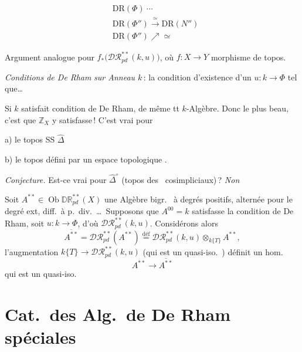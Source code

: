 \documentclass[11pt,a4paper]{article}
\begin{document}
\[
  \begin{aligned}
    &\mathrm{DR}(\Phi)\ \cdots\\
    &\mathrm{DR}(\Phi'')\xrightarrow{\ \simeq\ }\mathrm{DR}(N'')\\
    &\mathrm{DR}(\Phi'')\nearrow\simeq
  \end{aligned}
\]

Argument analogue pour $f_{*}\bigl(\mathcal{DR}^{**}_{pd}(k,u)\bigr)$, où
$f\colon X\to Y$ morphisme de topos.

\emph{Conditions de De Rham} \emph{sur Anneau $k$}\,: la condition
d'existence d'un $u\colon k\to\Phi$ tel que…

Si $k$ satisfait condition de De Rham, de même tt $k$-Algèbre. Donc le plus
beau, c'est que $\mathbb{Z}_{X}$ y satisfasse\,! C'est vrai pour

\quad a) le topos SS $\widehat{\Delta}$

\quad b) le topos défini par un espace topologique .

\emph{Conjecture.} Est-ce vrai pour $\widehat{\Delta}^{\circ}$ (topos des
\ cosimpliciaux)\,? \emph{Non}

Soit $A^{**}\in\operatorname{Ob}\mathbb{DR}^{**}_{pd}(X)$ une Algèbre bigr.\
 à degrés positifs, alternée pour le degré ext, diff.\ à p.\
div.\ …\ Supposons que $A^{00}=k$ satisfasse la condition de De Rham, soit
$u\colon k\to\Phi$, d'où $\mathcal{DR}^{**}_{pd}(k,u)$. Considérons alors
\[
  \overline{A^{**}}=\mathcal{DR}^{**}_{pd}(A^{**})
  \overset{\mathrm{déf}}{=}\mathcal{DR}^{**}_{pd}(k,u)\otimes_{k\{T\}}A^{**},
\]
l'augmentation $k\{T\}\to\mathcal{DR}^{**}_{pd}(k,u)$ (qui est un
quasi-iso.\ ) définit un hom.
\[
  A^{**}\longrightarrow\overline{A^{**}}
\]
qui est un quasi-iso.\  \struck{\ill{}}

\page{93}
\section{Cat.\ des Alg.\ de De Rham spéciales}
\end{document}
